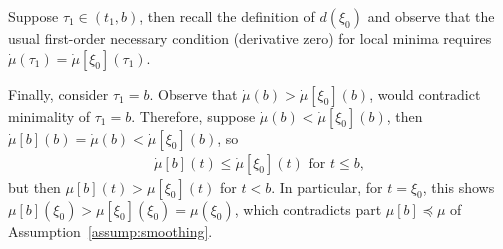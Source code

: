 \documentclass{report}
\theoremstyle{definition}
\theoremstyle{plain}
\begin{document}
Suppose $\tau_{1} \in (t_{1}, b)$, then recall the definition of $d(\xi_{0})$
and observe that the usual first-order necessary condition (derivative zero) for
local minima requires $\dot{\mu}(\tau_{1}) = \dot{\mu}[\xi_{0}](\tau_{1})$.

Finally, consider $\tau_{1} = b$.
%
Observe that $\dot{\mu}(b) > \dot{\mu}[\xi_{0}](b)$, would contradict
minimality of $\tau_{1} = b$. Therefore, suppose
$\dot{\mu}(b) < \dot{\mu}[\xi_{0}](b)$, then
$\dot{\mu}[b](b) = \dot{\mu}(b) < \dot{\mu}[\xi_{0}](b)$, so
\begin{align}
  \dot{\mu}[b](t) \leq \dot{\mu}[\xi_{0}](t) \text{ for } t \leq b ,
\end{align}
but then $\mu[b](t) > \mu[\xi_{0}](t)$ for $t < b$. In particular, for $t=\xi_{0}$, this shows
$\mu[b](\xi_{0}) > \mu[\xi_{0}](\xi_{0}) = \mu(\xi_{0})$, which contradicts part $\mu[b] \preceq \mu$ of
Assumption~\ref{assump:smoothing}.
\end{document}
